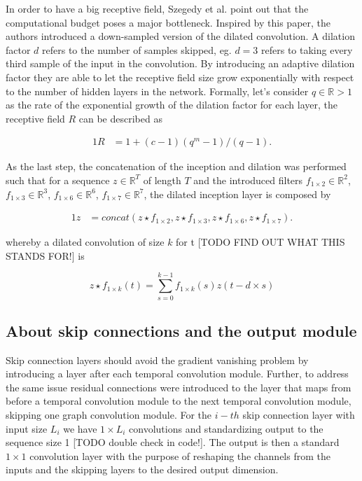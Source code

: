 \documentclass[letterpaper,twocolumn,11pt]{article}
\begin{document}
    In order to have a big receptive field, Szegedy et al. \cite{Szegedy_2015_CVPR} point out that the computational budget poses a major bottleneck.
    Inspired by this paper, the authors introduced a down-sampled version of the dilated convolution.
    A dilation factor $d$ refers to the number of samples skipped, eg. $d=3$ refers to taking every third sample of the input in the convolution.
    By introducing an adaptive dilation factor they are able to let the receptive field size grow exponentially with respect to the number of hidden layers in the network.
    Formally, let's consider $q \in \mathbb{R}>1$ as the rate of the exponential growth of the dilation factor for each layer,
    the receptive field $R$ can be described as

    \begin{alignat}{1}
        R &= 1 + (c-1)(q^m-1)/(q-1).  \label{eq:adaptive_receptive_field}
    \end{alignat}


    As the last step, the concatenation of the inception and dilation was performed such that for a sequence $z \in \mathbb{R}^T$ of length $T$ and the introduced filters
    $f_{1 \times 2} \in \mathbb{R}^2$,
    $f_{1 \times 3} \in \mathbb{R}^3$,
    $f_{1 \times 6} \in \mathbb{R}^6$,
    $f_{1 \times 7} \in \mathbb{R}^7$,
    the dilated inception layer is composed by

    \begin{alignat}{1}
        z &= concat(
        z \star f_{1 \times 2},
        z \star f_{1 \times 3},
        z \star f_{1 \times 6},
        z \star f_{1 \times 7}
        ).
        \label{eq:dilated_inception_layer_wrt_z}
    \end{alignat}

    whereby a dilated convolution of size $k$ for t [TODO FIND OUT WHAT THIS STANDS FOR!] is

    \begin{equation}
        z \star f_{1 \times k}(t) = \sum_{s=0}^{k-1} f_{1 \times k}(s)z(t-d \times s)
    \end{equation}

    \subsection{About skip connections and the output module}
    Skip connection layers should avoid the gradient vanishing problem by introducing a layer after each temporal convolution module.
    Further, to address the same issue residual connections were introduced to the layer that maps from before a temporal convolution module to the next temporal convolution module, skipping one graph convolution module.
    For the $i-th$ skip connection layer with input size $L_i$ we have  $1 \times L_i$ convolutions and standardizing output to the sequence size 1 [TODO double check in code!].
    The output is then a standard $ 1 \times 1$ convolution layer with the purpose of reshaping the channels from the inputs and the skipping layers to the desired output dimension.
\end{document}
